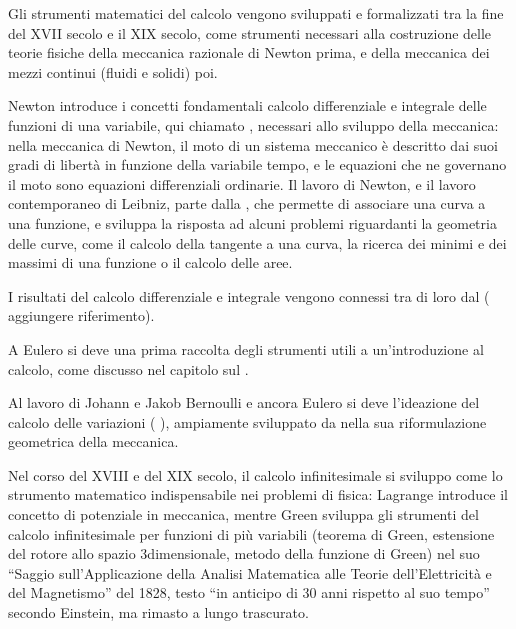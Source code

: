 \documentclass[letterpaper,10pt,english]{jupyterBook}
\begin{document}
\sphinxAtStartPar
Gli strumenti matematici del calcolo vengono sviluppati e formalizzati tra la fine del XVII secolo e il XIX secolo, come strumenti necessari alla costruzione delle teorie fisiche della meccanica razionale di Newton prima, e della meccanica dei mezzi continui (fluidi e solidi) poi.

\sphinxAtStartPar
Newton introduce i concetti fondamentali calcolo differenziale e integrale delle funzioni di una variabile, qui chiamato {\hyperref[\detokenize{ch/infinitesimal_calculus:infinitesimal-calculus}]{}}, necessari allo sviluppo della meccanica: nella meccanica di Newton, il moto di un sistema meccanico è descritto dai suoi gradi di libertà in funzione della variabile tempo, e le equazioni che ne governano il moto sono equazioni differenziali ordinarie. Il lavoro di Newton, e il lavoro contemporaneo di Leibniz, parte dalla {\hyperref[\detokenize{ch/analytic_geometry:geometry-analytic}]{}}, che permette di associare una curva a una funzione, e sviluppa la risposta ad alcuni problemi riguardanti la geometria delle curve, come il calcolo della tangente a una curva, la ricerca dei minimi e dei massimi di una funzione o il calcolo delle aree.

\sphinxAtStartPar
I risultati del calcolo differenziale e integrale vengono connessi tra di loro dal  ( aggiungere riferimento).

\sphinxAtStartPar
A Eulero si deve una prima raccolta degli strumenti utili a un’introduzione al calcolo, come discusso nel capitolo sul {\hyperref[\detokenize{ch/precalculus:math-hs-precalculus}]{}}.

\sphinxAtStartPar
Al lavoro di Johann e Jakob Bernoulli e ancora Eulero si deve l’ideazione del calcolo delle variazioni ( ), ampiamente sviluppato da  nella sua riformulazione geometrica della meccanica.

\sphinxAtStartPar
Nel corso del XVIII e del XIX secolo, il calcolo infinitesimale si sviluppo come lo strumento matematico indispensabile nei problemi di fisica: Lagrange introduce il concetto di potenziale in meccanica, mentre Green sviluppa gli strumenti del calcolo infinitesimale per funzioni di più variabili (teorema di Green, estensione del rotore allo spazio 3\sphinxhyphen{}dimensionale, metodo della funzione di Green) nel suo “Saggio sull’Applicazione della Analisi Matematica alle Teorie dell’Elettricità e del Magnetismo” del 1828, testo “in anticipo di 30 anni rispetto al suo tempo” secondo Einstein, ma rimasto a lungo trascurato.
\end{document}

